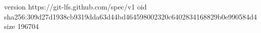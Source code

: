 version https://git-lfs.github.com/spec/v1
oid sha256:309d27d1938cb9319dda63d44bd464598002320c6402834168829b0e990584d4
size 196704
